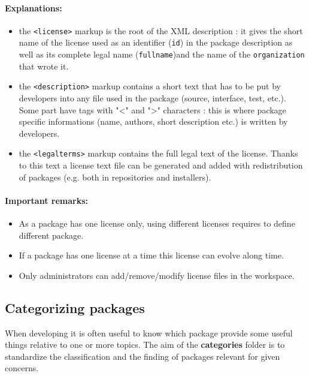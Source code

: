 \documentclass[12pt,a4paper]{article}
\begin{document}
\paragraph{Explanations:}
\begin{itemize}
\item the \texttt{<license>} markup is the root of the XML description : it gives the short name of the license used as an identifier (\texttt{id}) in the package description as well as its complete legal name (\texttt{fullname})and the name of the \texttt{organization} that wrote it.
\item the \texttt{<description>} markup contains a short text that has to be put by developers into any file used in the package (source, interface, test, etc.). Some part have tags with "<" and ">" characters : this is where package specific informations (name, authors, short description etc.) is written by developers.
\item the \texttt{<legalterms>} markup contains the full legal text of the license. Thanks to this text a license text file can be generated and added with redistribution of packages (e.g. both in repositories and installers).
\end{itemize}

\paragraph{Important remarks:} 
\begin{itemize}
\item As a package has one license only, using different licenses requires to define different package.
\item If a package has one license at a time this license can evolve along time.
\item Only administrators can add/remove/modify license files in the workspace.
\end{itemize}


\subsection{Categorizing packages}

When developing it is often useful to know which package provide some useful things relative to one or more topics. The aim of the \textbf{categories} folder is to standardize the classification and the finding of packages relevant for given concerns.
\end{document}

